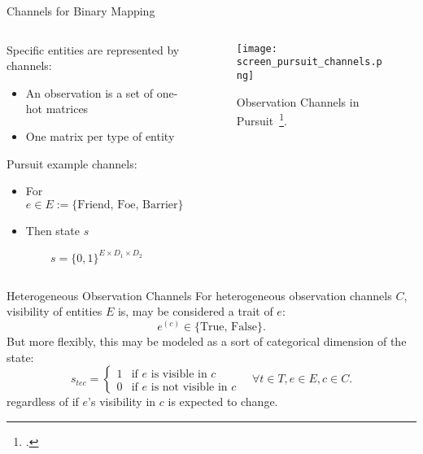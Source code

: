 \begin{frame}{Channels for Binary Mapping}
    \begin{columns}
        \begin{column}{0.6\linewidth}
            Specific entities are represented by channels:
                \begin{itemize}
                    \item An observation is a set of one-hot matrices
                    \item One matrix per type of entity
                \end{itemize}
            Pursuit example channels:
                \begin{itemize}
                    \item For \(e\in E := \{\text{Friend, Foe, Barrier}\}\)
                    \item Then state \(s\)
                \end{itemize}
                \[s = \{0,1\}^{E\times D_1\times D_2}\]
        \end{column}
        \begin{column}{0.4\linewidth}
            \begin{figure}
                \texttt{[image: screen\_pursuit\_channels.png]}
                \caption{Observation Channels in Pursuit~\footcite{gupta2017}.}
            \end{figure}
            \centering
        \end{column}
    \end{columns}
\end{frame}

\begin{frame}{Heterogeneous Observation Channels}
    For heterogeneous observation channels \(C\),
    visibility of entities \(E\) is, may be considered a
    trait of \(e\):
    \[
        e^{(c)} \in \{\text{True, False}\}.
    \]
    But more flexibly, this may be modeled 
    as a sort of categorical dimension of the state:
    \[
        s_{tec} = 
        \begin{cases}
            1& \text{if \(e\) is visible in \(c\)} \\ 
            0& \text{if \(e\) is not visible in \(c\)}
        \end{cases} 
        \quad\forall t\in T, e\in E, c\in C.
    \]
    regardless of if \(e\)'s visibility in \(c\) is expected to change.
\end{frame}

